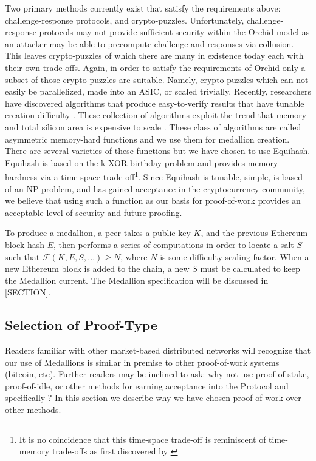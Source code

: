 Two primary methods currently exist that satisfy the requirements above: challenge-response protocols, and crypto-puzzles. Unfortunately, challenge-response protocols may not provide sufficient security within the Orchid model as an attacker may be able to precompute challenge and responses via collusion. This leaves crypto-puzzles of which there are many in existence today \cite{nakamoto2008bitcoin, Equihash} each with their own trade-offs. Again, in order to satisfy the requirements of Orchid only a subset of those crypto-puzzles are suitable. Namely, crypto-puzzles which can not easily be parallelized, made into an ASIC, or scaled trivially. Recently, researchers have discovered algorithms that produce easy-to-verify results that have tunable creation difficulty \cite{Equihash}. These collection of algorithms exploit the trend that memory and total silicon area is expensive to scale \cite{abadi2005moderately, dwork2005pebbling}. These class of algorithms are called asymmetric memory-hard functions and we use them for medallion creation. There are several varieties of these functions \cite{tromp2014cuckoo, lorimermomentum, Equihash} but we have chosen to use Equihash. Equihash is based on the k-XOR birthday problem and provides memory hardness via a time-space trade-off\footnote{It is no coincidence that this time-space trade-off is reminiscent of time-memory trade-offs as first discovered by \cite{hellman1980cryptanalytic}}. Since Equihash is tunable, simple, is based of an NP problem, and has gained acceptance in the cryptocurrency community, we believe that using such a function as our basis for proof-of-work provides an acceptable level of security and future-proofing.

To produce a medallion, a peer takes a public key $K$, and the previous Ethereum block hash $E$, then performs a series of computations in order to locate a salt $S$ such that $\mathcal{F}(K, E, S, ...) \geq N$, where $N$ is some difficulty scaling factor. When a new Ethereum block is added to the chain, a new $S$ must be calculated to keep the Medallion current. The Medallion specification will be discussed in {\color{red}[SECTION]}.

\subsection{Selection of Proof-Type}
\label{medallion-proof}

Readers familiar with other market-based distributed networks will recognize that our use of Medallions is similar in premise to other proof-of-work systems (bitcoin, etc). Further readers may be inclined to ask: why not use proof-of-stake, proof-of-idle, or other methods for earning acceptance into the \Orchid{} Protocol and specifically \tOM{}? In this section we describe why we have chosen proof-of-work over other methods.

